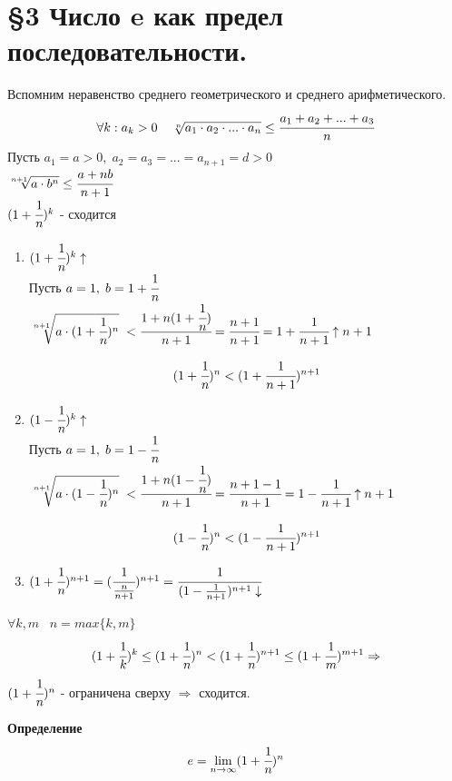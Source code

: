 \documentclass[12pt, paper]{article}
\begin{document}
\section{\S 3 Число e как предел последовательности.}
Вспомним неравенство среднего геометрического и среднего арифметического.
\[\forall k: a_k>0\;\;\;\ \sqrt[n]{a_1\cdot a_2\cdot ... \cdot a_n} \leq \cfrac{a_1+a_2+...+a_3}{n} \]
Пусть $a_1 = a > 0,\;a_2=a_3=...=a_{n+1}=d>0$\\
$\sqrt[n+1]{a\cdot b^n} \leq \cfrac{a+nb}{n+1}$\\
$(1+\cfrac{1}{n})^k$ - сходится
\begin{tcolorbox}[title=Доказательства монотонности]
    \begin{enumerate}
        \item $(1+\cfrac{1}{n})^k \uparrow$\\
        Пусть $a = 1,\;b=1+\cfrac{1}{n}$\\
        $\sqrt[n+1]{a\cdot(1+\cfrac{1}{n})^n}\; < \cfrac{1+n(1+\cfrac{1}{n})}{n+1} = \cfrac{n+1}{n+1} = 1+\cfrac{1}{n+1} \uparrow n+1 $
        \begin{tcolorbox}
            \[ (1+\cfrac{1}{n})^n < (1+\cfrac{1}{n+1})^{n+1} \]
        \end{tcolorbox}
        \item $(1-\cfrac{1}{n})^k \uparrow$\\
        Пусть $a = 1,\;b=1-\cfrac{1}{n}$\\
        $\sqrt[n+1]{a\cdot(1-\cfrac{1}{n})^n}\; < \cfrac{1+n(1-\cfrac{1}{n})}{n+1} = \cfrac{n+1-1}{n+1} = 1-\cfrac{1}{n+1} \uparrow n+1 $
        \begin{tcolorbox}
            \[ (1-\cfrac{1}{n})^n < (1-\cfrac{1}{n+1})^{n+1} \]    
        \end{tcolorbox}
        \item $(1+\cfrac{1}{n})^{n+1} = (\cfrac{1}{\frac{n}{n+1}})^{n+1} = \cfrac{1}{(1-\frac{1}{n+1})^{n+1} \downarrow } $
    \end{enumerate}
\end{tcolorbox}
$\forall k,m \;\;\; n=max\{k,m\}$\\
\[ (1+\cfrac{1}{k})^k \leq (1+\cfrac{1}{n})^n < (1+\cfrac{1}{n})^{n+1} \leq (1+\cfrac{1}{m})^{m+1} \Rightarrow \]
$(1+\cfrac{1}{n})^n$ - ограничена сверху $\Rightarrow$ сходится.

\begin{tcolorbox}
    \textbf{Определение} 
    \[e = \lim_{n\to \infty} (1+\cfrac{1}{n})^n \]
\end{tcolorbox}
\end{document}
